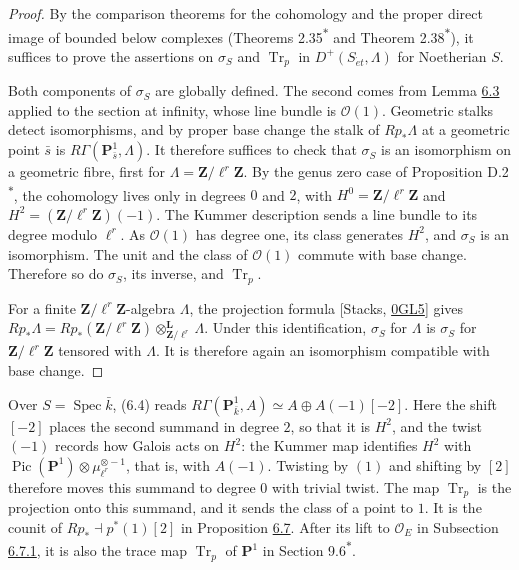 \documentclass[11pt]{article}
\newcommand{\bpout}[1]{#1\textsuperscript{\hyperlink{bp-outside}{\ensuremath{\ast}}}}
\begin{document}
\begin{proof}[{Proof}]\label{bp15}%
By the comparison theorems for the cohomology and the proper direct image of bounded below complexes (Theorems \bpout{2.35} and \bpout{Theorem 2.38}), it suffices to prove the assertions on \(\sigma_S\) and \(\operatorname{Tr}_p\) in \(D^+(S_{\acute{e}t},\Lambda)\) for Noetherian \(S\).

Both components of \(\sigma_S\) are globally defined. The second comes from Lemma \hyperref[bp11]{6.3} applied to the section at infinity, whose line bundle is \(\mathcal O(1)\). Geometric stalks detect isomorphisms, and by proper base change the stalk of \(Rp_*\Lambda\) at a geometric point \(\bar s\) is \(R\Gamma(\mathbf P^1_{\bar s},\Lambda)\). It therefore suffices to check that \(\sigma_S\) is an isomorphism on a geometric fibre, first for \(\Lambda=\mathbf Z/\ell^r\mathbf Z\). By the genus zero case of Proposition \bpout{D.2}, the cohomology lives only in degrees \(0\) and \(2\), with \(H^0=\mathbf Z/\ell^r\mathbf Z\) and \(H^2=(\mathbf Z/\ell^r\mathbf Z)(-1)\). The Kummer description sends a line bundle to its degree modulo \(\ell^r\). As \(\mathcal O(1)\) has degree one, its class generates \(H^2\), and \(\sigma_S\) is an isomorphism. The unit and the class of \(\mathcal O(1)\) commute with base change. Therefore so do \(\sigma_S\), its inverse, and \(\operatorname{Tr}_p\).

For a finite \(\mathbf Z/\ell^r\mathbf Z\)-algebra \(\Lambda\), the projection formula [Stacks, \href{https://stacks.math.columbia.edu/tag/0GL5}{0GL5}] gives \(Rp_*\Lambda=Rp_*(\mathbf Z/\ell^r\mathbf Z)
\otimes^{\mathbf L}_{\mathbf Z/\ell^r}\Lambda\). Under this identification, \(\sigma_S\) for \(\Lambda\) is \(\sigma_S\) for \(\mathbf Z/\ell^r\mathbf Z\) tensored with \(\Lambda\). It is therefore again an isomorphism compatible with base change.
\end{proof}

\label{bp16}%
Over \(S=\operatorname{Spec}\bar k\), (6.4) reads \(R\Gamma(\mathbf P^1_{\bar k},A)\simeq A\oplus A(-1)[-2]\). Here the shift \([-2]\) places the second summand in degree \(2\), so that it is \(H^2\), and the twist \((-1)\) records how Galois acts on \(H^2\): the Kummer map identifies \(H^2\) with \(\operatorname{Pic}(\mathbf P^1)\otimes\mu_{\ell^r}^{\otimes-1}\), that is, with \(A(-1)\). Twisting by \((1)\) and shifting by \([2]\) therefore moves this summand to degree \(0\) with trivial twist. The map \(\operatorname{Tr}_p\) is the projection onto this summand, and it sends the class of a point to \(1\). It is the counit of \(Rp_*\dashv p^*(1)[2]\) in Proposition \hyperref[bp22]{6.7}. After its lift to \(\mathcal O_E\) in Subsection \hyperref[bp67]{6.7.1}, it is also the trace map \(\operatorname{Tr}_p\) of \(\mathbf P^1\) in Section \bpout{9.6}.
\end{document}
